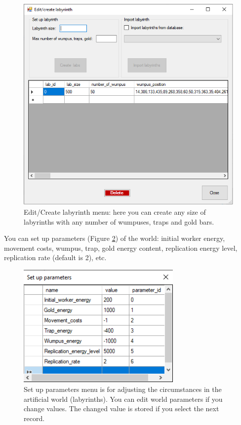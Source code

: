 \documentclass[a4paper,12pt]{article}
\begin{document}
\begin{figure}
	\begin{center}
		\includegraphics[width=12cm]{mnu_createlabs.png}
		\caption{Edit/Create labyrinth menu: here you can create any size of labyrinths with any number of wumpuses, traps and gold bars.}
		\label{fig:mnu_createlabs}
	\end{center}
\end{figure}

 
You can set up parameters (Figure \ref{fig:mnu_showparameters}) of the world: initial worker energy, movement costs, wumpus, trap, gold energy content, replication energy level, replication rate (default is 2), etc. 

\begin{figure}
	\begin{center}
		\includegraphics[width=8cm]{mnu_showparameter.png}
		\caption{Set up parameters menu is for adjusting the circumstances in the artificial world (labyrinths). You can edit world parameters if you change values. The changed value is stored if you select the next record.}
		\label{fig:mnu_showparameters}
	\end{center}
\end{figure}
\end{document}
